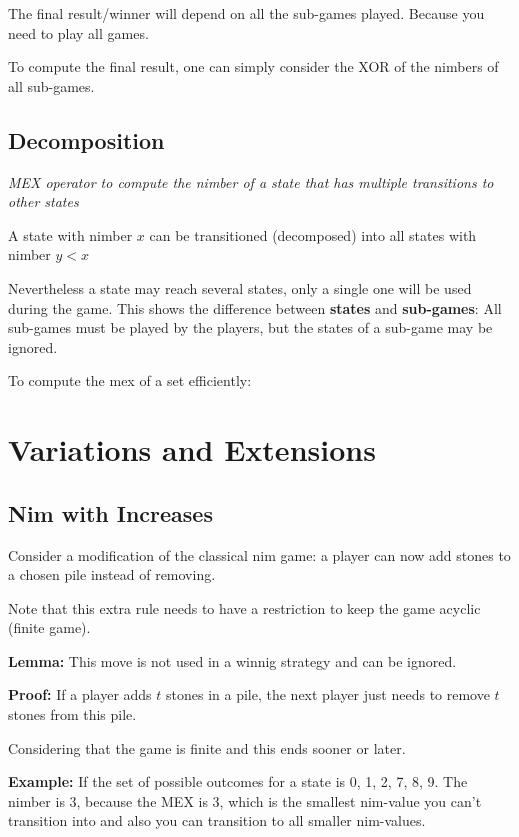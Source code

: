 The final result/winner will depend on all the sub-games played. Because you need to play all games.

To compute the final result, one can simply consider the XOR of the nimbers of all sub-games.

\subsection{Decomposition}

\textit{MEX operator to compute the nimber of a state that has multiple transitions to other states}

A state with nimber $x$ can be transitioned (decomposed) into all states with nimber $ y < x $

Nevertheless a state may reach several states, only a single one will be used during the game.
This shows the difference between \textbf{states} and \textbf{sub-games}: All sub-games must be played
by the players, but the states of a sub-game may be ignored. 

To compute the mex of a set efficiently:


\section{Variations and Extensions}

\subsection{Nim with Increases}

Consider a modification of the classical nim game: a player can now add stones to a chosen pile instead of removing.

Note that this extra rule needs to have a restriction to keep the game acyclic (finite game).

\textbf{Lemma:} This move is not used in a winnig strategy and can be ignored.

\textbf{Proof:} If a player adds $t$ stones in a pile, 
the next player just needs to remove $t$ stones from this pile. 

Considering that the game is finite and this ends sooner or later.

\textbf{Example:}
If the set of possible outcomes for a state is {0, 1, 2, 7, 8, 9}. 
The nimber is 3, because the MEX is 3, which is the smallest nim-value you can't transition into 
and also you can transition to all smaller nim-values.

